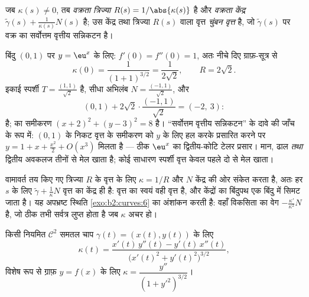 \begin{definition}\label{def:b2:curves:curvature}
जब $\kappa(s) \neq 0$, तब \emph{वक्रता
त्रिज्या} $R(s) =
1/\abs{\kappa(s)}$ है और \emph{वक्रता
केंद्र}
$\tilde\gamma(s) + \frac{1}{\kappa(s)} N(s)$ है; उस केंद्र तथा त्रिज्या $R(s)$
वाला वृत्त \emph{चुंबन वृत्त} है, जो $\tilde\gamma(s)$ पर
वक्र का सर्वोत्तम वृत्तीय सन्निकटन है।
\end{definition}

\begin{example}[चरघातांकी का चुंबन
वृत्त]\label{ex:b2:curves:oscexp}
बिंदु $(0, 1)$ पर $y = \eu^x$ के लिए: $f'(0) = f''(0) = 1$,
अतः नीचे दिए ग्राफ़-सूत्र से
\[
\kappa(0) = \frac{1}{(1 + 1)^{3/2}} = \frac1{2\sqrt2},
\qquad R = 2\sqrt2 .
\]
इकाई स्पर्शी $T = \frac{(1, 1)}{\sqrt2}$ है, सीधा अभिलंब
$N = \frac{(-1, 1)}{\sqrt2}$, और 
\[
(0, 1) + 2\sqrt2\cdot\frac{(-1, 1)}{\sqrt2} = (-2,\ 3) :
\]
है;  का समीकरण $(x + 2)^2 + (y - 3)^2 =
8$ है। ``सर्वोत्तम वृत्तीय सन्निकटन'' के दावे की जाँच के रूप में:
$(0,1)$ के निकट वृत्त के समीकरण को $y$ के लिए हल करके
प्रसारित करने पर $y = 1 + x + \frac{x^2}2 + O(x^3)$ मिलता है ---
ठीक $\eu^x$ का द्वितीय-कोटि टेलर प्रसार।  मान, ढाल
\emph{तथा} द्वितीय अवकलज तीनों से मेल खाता है; कोई साधारण स्पर्शी
वृत्त केवल पहले दो से मेल खाता।
\end{example}

\begin{example}[वृत्त की विकसिता उसका
केंद्र है]\label{ex:b2:curves:circleevolute}
वामावर्त तय किए गए त्रिज्या $R$ के वृत्त के लिए
$\kappa = 1/R$ और $N$ केंद्र की ओर संकेत करता है, अतः हर $s$
के लिए  $\tilde\gamma + \frac1\kappa N$ वृत्त का
केंद्र ही है: वृत्त का  स्वयं वही वृत्त है, और 
केंद्रों का बिंदुपथ एक बिंदु में सिमट जाता है। यह अपभ्रष्ट स्थिति
\cref{exo:b2:curves:6} का अंशांकन करती है: वहाँ विकसिता का
वेग $-\frac{\kappa'}{\kappa^2}N$ है, जो ठीक तभी सर्वत्र लुप्त
होता है जब $\kappa$ अचर हो।
\end{example}

\begin{proposition}[स्वेच्छ प्राचलन में
वक्रता]\label{prop:b2:curves:kappaformula}
किसी नियमित $\mathcal{C}^2$ समतल चाप $\gamma(t) = (x(t), y(t))$ के लिए
\[
\kappa(t)
= \frac{x'(t)\,y''(t) - y'(t)\,x''(t)}
       {\bigl(x'(t)^2 + y'(t)^2\bigr)^{3/2}} ,
\]
विशेष रूप से ग्राफ़ $y = f(x)$ के लिए $\kappa = \dfrac{y''}{(1 + y'^2)^{3/2}}$।
\end{proposition}

